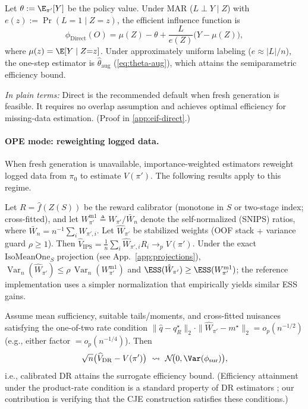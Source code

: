 \begin{prop}
\label{prop:direct-eif}
Let $\theta := \E_{\pi'}[Y]$ be the policy value. Under MAR ($L \perp Y \mid Z$) with $e(z) := \Pr(L{=}1 \mid Z{=}z)$, the efficient influence function is
\[
\phi_{\mathrm{Direct}}(O) = \mu(Z) - \theta + \frac{L}{e(Z)}\big(Y - \mu(Z)\big),
\]
where $\mu(z) = \E[Y \mid Z{=}z]$. Under approximately uniform labeling ($e \approx |L|/n$), the one-step estimator is $\hat\theta_{\mathrm{aug}}$ (\cref{eq:theta-aug}), which attains the semiparametric efficiency bound.
\end{prop}

\noindent\emph{In plain terms:} Direct is the recommended default when fresh generation is feasible. It requires no overlap assumption and achieves optimal efficiency for missing-data estimation. (Proof in \cref{app:eif-direct}.)

\paragraph{OPE mode: reweighting logged data.}
When fresh generation is unavailable, importance-weighted estimators reweight logged data from $\pi_0$ to estimate $V(\pi')$. The following results apply to this regime.

\begin{prop}
\label{prop:calips}
Let $R=\hat f(Z(S))$ be the reward calibrator (monotone in $S$ or two-stage index; cross-fitted), and let
$W^{\mathrm{m1}}_{\pi'}\!\triangleq W_{\pi'}/\bar W_n$ denote the self-normalized (SNIPS) ratios, where $\bar W_n = n^{-1}\sum_i W_{\pi',i}$.
Let $\hat W_{\pi'}$ be stabilized weights (OOF stack $+$ variance guard $\rho\ge1$).
Then $\widehat V_{\mathrm{IPS}}=\tfrac{1}{n}\sum_i \hat W_{\pi',i}R_i \to_p V(\pi')$.
Under the exact $\mathrm{IsoMeanOne}_S$ projection (see App.~\ref{app:projections}),
$\operatorname{Var}_n(\hat W_{\pi'})\le \rho\,\operatorname{Var}_n(W^{\mathrm{m1}}_{\pi'})$ and
$\ESS(\hat W_{\pi'})\ge \ESS(W^{\mathrm{m1}}_{\pi'})$; the reference implementation uses a simpler normalization that empirically yields similar ESS gains.
\end{prop}

\begin{theorem}
\label{thm:dr-eff}
Assume mean sufficiency, suitable tails/moments, and cross-fitted nuisances satisfying the one-of-two
rate condition
$\|\hat q-q^\star_R\|_2\cdot \|\hat W_{\pi'}-m^\star\|_2 = o_p(n^{-1/2})$
(e.g., either factor $=o_p(n^{-1/4})$). Then
\[
\sqrt{n}\big(\widehat V_{\mathrm{DR}}-V(\pi')\big)\ \leadsto\ \mathcal{N}\!\big(0,\Var(\phi_{\mathrm{sur}})\big),
\]
i.e., calibrated DR attains the surrogate efficiency bound. (Efficiency attainment under the product-rate condition is a standard property of DR estimators \citep{BangRobins2005,Chernozhukov2018}; our contribution is verifying that the CJE construction satisfies these conditions.)
\end{theorem}

